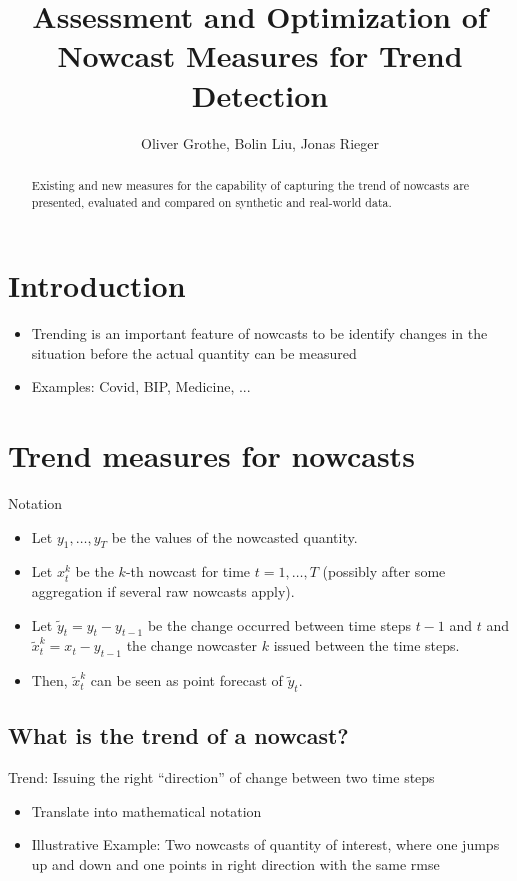 \documentclass[oneside]{article}
\title{Assessment and Optimization of Nowcast Measures for Trend Detection}
\author{Oliver Grothe, Bolin Liu, Jonas Rieger}
\theoremstyle{plain}%
\theoremstyle{definition}
\newcommand{\ydiff}{\tilde{y}}
\newcommand{\xdiff}{\tilde{x}}
\begin{document}
\maketitle

\begin{abstract}
Existing and new measures for the capability of capturing the trend of nowcasts are presented, evaluated and compared on synthetic and real-world data.
\end{abstract}

\section{Introduction}

\begin{itemize}
	\item Trending is an important feature of nowcasts to be identify changes in the situation before the actual quantity can be measured
	\item Examples: Covid, BIP, Medicine, ... 
\end{itemize}

\section{Trend measures for nowcasts}

Notation
\begin{itemize}
  \item Let $y_1, \ldots, y_T$ be the values of the nowcasted quantity.
  \item Let $x_t^k$ be the $k$-th nowcast for time $t = 1, \ldots, T$ (possibly after some aggregation if several raw nowcasts apply).
  \item Let $\ydiff_t = y_t - y_{t-1}$ be the change occurred between time steps $t-1$ and $t$ and $\xdiff_t^k = x_t - y_{t-1}$ the change nowcaster $k$ issued between the time steps. 
  \item Then, $\xdiff_t^k$ can be seen as point forecast of $\ydiff_t$. 
\end{itemize}


\subsection{What is the trend of a nowcast?}

Trend: Issuing the right \enquote{direction} of change between two time steps

\begin{itemize}
  \item Translate into mathematical notation
  \item Illustrative Example: Two nowcasts of quantity of interest, where one jumps up and down and one points in right direction with the same rmse
\end{itemize}
\end{document}
